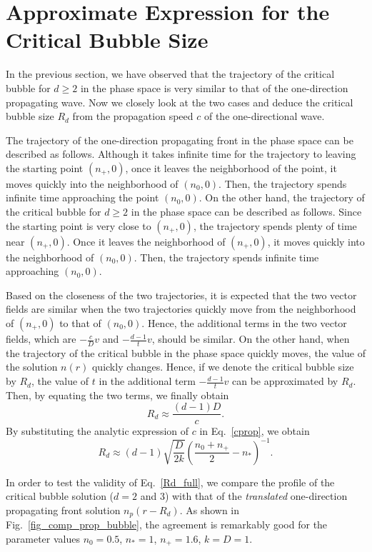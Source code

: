 \documentclass{article}
\begin{document}
\section{Approximate Expression for the Critical Bubble Size} 

In the previous section, we have observed that the trajectory of the critical bubble for $d\ge2$ in the phase space is very similar to that of the one-direction propagating wave. Now we closely look at the two cases and deduce the critical bubble size $R_d$ from the propagation speed $c$ of the one-directional wave.

The trajectory of the one-direction propagating front in the phase space can be described as follows.
Although it takes infinite time for the trajectory to leaving the starting point $(n_+,0)$, once it leaves the neighborhood of the point, it moves quickly into the neighborhood of $(n_0,0)$.
Then, the trajectory spends infinite time approaching the point $(n_0,0)$.
On the other hand, the trajectory of the critical bubble for $d\ge2$ in the phase space can be described as follows.
Since the starting point is very close to $(n_+,0)$, the trajectory spends plenty of time near $(n_+,0)$.
Once it leaves the neighborhood of $(n_+,0)$, it moves quickly into the neighborhood of $(n_0,0)$.
Then, the trajectory spends infinite time approaching $(n_0,0)$. 

Based on the closeness of the two trajectories, it is expected that the two vector fields are similar when the two trajectories quickly move from the neighborhood of $(n_+,0)$ to that of $(n_0,0)$. 
Hence, the additional terms in the two vector fields, which are $-\frac{c}{D}v$ and $-\frac{d-1}{t}v$, should be similar.
On the other hand, when the trajectory of the critical bubble in the phase space quickly moves, the value of the solution $n(r)$ quickly changes.
Hence, if we denote the critical bubble size by $R_d$, the value of $t$ in the additional term $-\frac{d-1}{t}v$ can be approximated by $R_d$.
Then, by equating the two terms, we finally obtain
\begin{equation}
\label{Rd}
R_d\approx\frac{(d-1)D}{c}.
\end{equation}
By substituting the analytic expression of $c$ in Eq.~\eqref{cprop}, we obtain
\begin{equation}
\label{Rd_full}
R_d\approx (d-1)\sqrt{\frac{D}{2k}}\left(\frac{n_0+n_+}{2}-n_*\right)^{-1}.
\end{equation}

In order to test the validity of Eq.~\eqref{Rd_full}, we compare the profile of the critical bubble solution ($d=2$ and 3) with that of the \textit{translated} one-direction propagating front solution $n_p(r-R_d)$.
As shown in Fig.~\ref{fig_comp_prop_bubble}, the agreement is remarkably good for the parameter values $n_0=0.5$, $n_*=1$, $n_+=1.6$, $k=D=1$.
 
\end{document}
